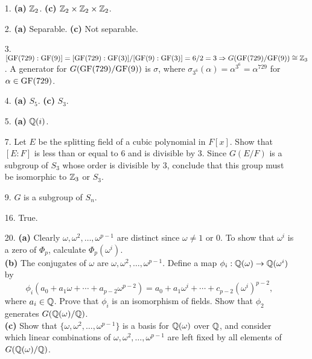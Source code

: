 {\small
\begin{itemize}
 
\bf\item[1.]\rm
{\bf (a)} ${\Bbb Z}_2$.
{\bf (c)} ${\Bbb Z}_2 \times {\Bbb Z}_2 \times {\Bbb Z}_2$.
 
\bf\item[2.]\rm
{\bf (a)} Separable.
{\bf (c)} Not separable.
 
\bf\item[3.]\rm
$[{\rm GF}(729): {\rm GF}(9)] = [{\rm GF}(729): {\rm GF}(3)] /[{\rm
GF}(9): {\rm GF}(3)] = 6/2 = 3 \Rightarrow G({\rm GF}(729)/ {\rm
GF}(9)) \cong {\Bbb Z}_3$. A generator for $G({\rm GF}(729)/ {\rm
GF}(9))$ is $\sigma$, where $\sigma_{3^6}( \alpha) = \alpha^{3^6} =
\alpha^{729}$ for $\alpha \in {\rm GF}(729)$.

\bf\item[4.]\rm
{\bf (a)} $S_5$.
{\bf (c)} $S_3$.

\bf\item[5.]\rm
{\bf (a)} ${\Bbb Q}(i)$.


\bf\item[7.]\rm
Let $E$ be the splitting field of a cubic polynomial in $F[x]$. Show that
\mbox{$[E:F]$} is less than or equal to 6 and is divisible by 3. Since $G(E/F)$ is a subgroup of
$S_3$ whose order is divisible by 3, conclude that this group must be 
isomorphic to ${\Bbb Z}_3$ or $S_3$.
 
\bf\item[9.]\rm
$G$ is a subgroup of $S_n$.

\bf\item[16.]\rm
True.

\bf\item[20.]\rm
{\bf (a)} Clearly $\omega, \omega^2, \ldots, \omega^{p-1}$ are
distinct since $\omega \neq 1$ or 0. To show that $\omega^i$ is a zero
of $\Phi_p$, calculate $\Phi_p( \omega^i)$. \\
{\bf (b)} The conjugates of $\omega$ are $\omega, \omega^2, \ldots,
\omega^{p-1}$. Define a map  $\phi_i: {\Bbb Q}(\omega)
\rightarrow {\Bbb Q}(\omega^i)$ by 
\[
\phi_i(a_0 + a_1 \omega +
\cdots + a_{p-2} \omega^{p-2}) = a_0 + a_1 \omega^i + \cdots + c_{p-2} 
(\omega^i)^{p-2},
\]
where $a_i \in {\Bbb Q}$. Prove that $\phi_i$ is an isomorphism of
fields. Show that $\phi_2$ 
generates $G({\Bbb Q}(\omega)/{\Bbb Q})$. \\ 
{\bf (c)}
Show that $\{ \omega, \omega^2, \ldots, \omega^{p-1} \}$ is a basis
for ${\Bbb Q}( \omega )$ over ${\Bbb Q}$, and consider which linear
combinations of $\omega, \omega^2, \ldots, \omega^{p-1}$ are left
fixed by all elements of $G( {\Bbb Q}( \omega ) / {\Bbb Q})$.
 
 
 
\end{itemize}
}
 
 
 
 
\pagestyle{headings}
 
 
 
 
